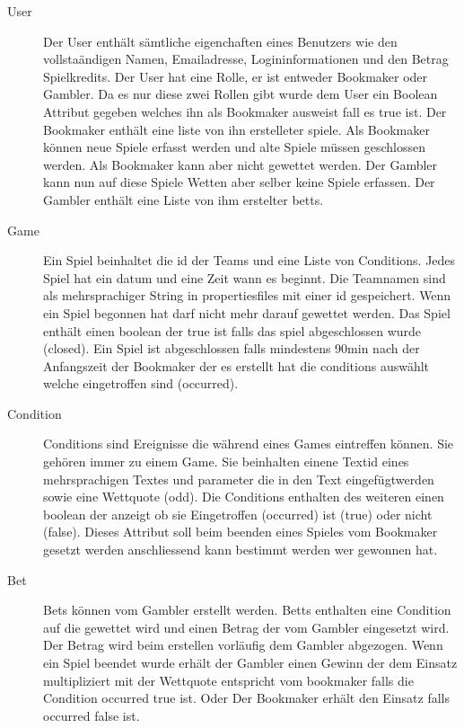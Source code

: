 \documentclass[a4paper, abstracton]{scrartcl}
\begin{document}
  \begin{description}
    \item[User]
      Der User enthält sämtliche eigenchaften eines Benutzers wie
      den vollstaändigen Namen, Emailadresse, Logininformationen und den Betrag
      Spielkredits. Der User hat eine Rolle, er ist entweder
      Bookmaker oder Gambler. Da es nur diese zwei Rollen gibt wurde dem User
      ein Boolean Attribut gegeben welches ihn als Bookmaker ausweist fall es
      true ist. Der Bookmaker enthält eine liste von ihn erstelleter spiele.
      Als Bookmaker können neue Spiele erfasst werden und alte Spiele müssen
      geschlossen werden. Als Bookmaker kann aber nicht gewettet werden.
      Der Gambler kann nun auf diese Spiele Wetten aber selber keine Spiele
      erfassen. Der Gambler enthält eine Liste von ihm erstelter betts.
      
    \item[Game]
      Ein Spiel beinhaltet die id der Teams und eine Liste von Conditions.
      Jedes Spiel hat ein datum und eine Zeit wann es beginnt.
      Die Teamnamen sind als mehrsprachiger String in propertiesfiles mit einer
      id gespeichert.
      Wenn ein Spiel begonnen hat darf nicht mehr darauf gewettet werden.
      Das Spiel enthält einen boolean der true ist falls das spiel abgeschlossen
      wurde (closed). Ein Spiel ist abgeschlossen falls mindestens 90min nach
      der Anfangszeit der Bookmaker der es erstellt hat die conditions
      auswählt welche eingetroffen sind (occurred).
      
    \item[Condition]
      Conditions sind Ereignisse die während eines Games eintreffen können.
      Sie gehören immer zu einem Game.
      Sie beinhalten einene Textid eines mehrsprachigen Textes und parameter
      die in den Text eingefügtwerden sowie eine Wettquote (odd).  
      Die Conditions enthalten des weiteren einen boolean der anzeigt ob
      sie Eingetroffen (occurred) ist (true) oder nicht (false).
      Dieses Attribut soll beim beenden eines Spieles vom Bookmaker gesetzt
      werden anschliessend kann bestimmt werden wer gewonnen hat.
      
    \item[Bet]
      Bets können vom Gambler erstellt werden.
      Betts enthalten eine Condition auf die gewettet wird und einen Betrag
      der vom Gambler eingesetzt wird. Der Betrag wird beim erstellen vorläufig
      dem Gambler abgezogen. Wenn ein Spiel beendet wurde erhält der Gambler
      einen Gewinn der dem Einsatz multipliziert mit der Wettquote entspricht
      vom bookmaker falls die Condition occurred true ist. Oder Der Bookmaker
      erhält den Einsatz falls occurred false ist. 
      
  \end{description}
\end{document}
